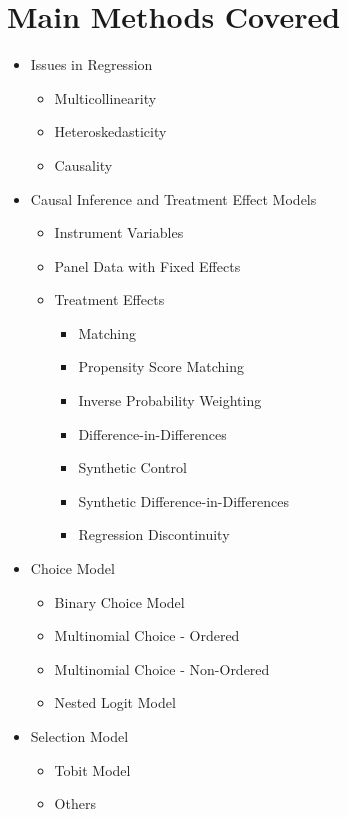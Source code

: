 \documentclass[12pt, a4paper]{article}
\begin{document}
\section{Main Methods Covered}
\begin{itemize}
    
    \item Issues in Regression
    \begin{itemize}
        \item Multicollinearity
        \item Heteroskedasticity
        \item Causality
    \end{itemize}
    
    \item Causal Inference and Treatment Effect Models
    \begin{itemize}
        \item Instrument Variables
        \item Panel Data with Fixed Effects
        \item Treatment Effects
        \begin{itemize}
            \item Matching
            \item Propensity Score Matching
            \item Inverse Probability Weighting
            \item Difference-in-Differences
            \item Synthetic Control
            \item Synthetic Difference-in-Differences
            \item Regression Discontinuity
        \end{itemize}
    \end{itemize}

    \item Choice Model
    \begin{itemize}
        \item Binary Choice Model
        \item Multinomial Choice - Ordered
        \item Multinomial Choice - Non-Ordered
        \item Nested Logit Model
    \end{itemize}

    \item Selection Model
    \begin{itemize}
        \item Tobit Model
        \item Others
    \end{itemize}

\end{itemize}
\end{document}
